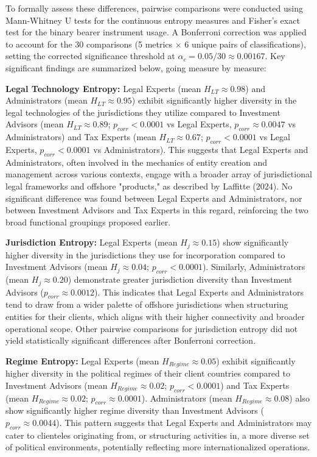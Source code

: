 To formally assess these differences, pairwise comparisons were conducted using Mann-Whitney U tests for the continuous entropy measures and Fisher's exact test for the binary bearer instrument usage. A Bonferroni correction was applied to account for the 30 comparisons (5 metrics $\times$ 6 unique pairs of classifications), setting the corrected significance threshold at $\alpha_c = 0.05/30 \approx 0.00167$. Key significant findings are summarized below, going measure by measure:

\textbf{Legal Technology Entropy:}
Legal Experts (mean $H_{LT} \approx 0.98$) and Administrators (mean $H_{LT} \approx 0.95$) exhibit significantly higher diversity in the legal technologies of the jurisdictions they utilize compared to Investment Advisors (mean $H_{LT} \approx 0.89$; $p_{corr} < 0.0001$ vs Legal Experts, $p_{corr} \approx 0.0047$ vs Administrators) and Tax Experts (mean $H_{LT} \approx 0.67$; $p_{corr} < 0.0001$ vs Legal Experts, $p_{corr} < 0.0001$ vs Administrators). This suggests that Legal Experts and Administrators, often involved in the mechanics of entity creation and management across various contexts, engage with a broader array of jurisdictional legal frameworks and offshore "products," as described by Laffitte (2024). No significant difference was found between Legal Experts and Administrators, nor between Investment Advisors and Tax Experts in this regard, reinforcing the two broad functional groupings proposed earlier.

\textbf{Jurisdiction Entropy:}
Legal Experts (mean $H_j \approx 0.15$) show significantly higher diversity in the jurisdictions they use for incorporation compared to Investment Advisors (mean $H_j \approx 0.04$; $p_{corr} < 0.0001$). Similarly, Administrators (mean $H_j \approx 0.20$) demonstrate greater jurisdiction diversity than Investment Advisors ($p_{corr} \approx 0.0012$). This indicates that Legal Experts and Administrators tend to draw from a wider palette of offshore jurisdictions when structuring entities for their clients, which aligns with their higher connectivity and broader operational scope. Other pairwise comparisons for jurisdiction entropy did not yield statistically significant differences after Bonferroni correction.

\textbf{Regime Entropy:}
Legal Experts (mean $H_{Regime} \approx 0.05$) exhibit significantly higher diversity in the political regimes of their client countries compared to Investment Advisors (mean $H_{Regime} \approx 0.02$; $p_{corr} < 0.0001$) and Tax Experts (mean $H_{Regime} \approx 0.02$; $p_{corr} \approx 0.0001$). Administrators (mean $H_{Regime} \approx 0.08$) also show significantly higher regime diversity than Investment Advisors ($p_{corr} \approx 0.0044$). This pattern suggests that Legal Experts and Administrators may cater to clienteles originating from, or structuring activities in, a more diverse set of political environments, potentially reflecting more internationalized operations.

